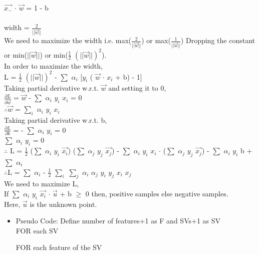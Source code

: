 \documentclass{article}
\begin{document}
\begin{itemize}
\begin{itemize}
        $\Vec{x_{-}}$ $\cdot$ $\Vec{w}$ = 1 - b
        \\ \\width  = $\frac{2}{||\Vec{w}||}$
        \\We need to maximize the width i.e. max($\frac{2}{||\Vec{w}||}$) or max($\frac{1}{||\Vec{w}||}$) Dropping the constant or min($||\Vec{w}||$) or min($\frac{1}{2}$ $(||\Vec{w}||)^{2}$).
        \\In order to maximize the width,
        \\L = $\frac{1}{2}$ $(||\Vec{w}||)^{2}$ - $\sum$ $\alpha_{i}$ [$y_{i}$ ( $\Vec{w}$ $\cdot$ $x_{i}$ + b) - 1]
        \\Taking partial derivative w.r.t. $\Vec{w}$ and setting it to 0,
        \\$\frac{\partial L}{\partial \Vec{w}}$ = $\Vec{w}$ - $\sum$ $\alpha_{i}$ $y_{i}$ $x_{i}$ = 0 
        \\$\therefore \Vec{w}$ = $\sum_{i}$ $\alpha_{i}$ $y_{i}$ $x_{i}$
        \\Taking partial derivative w.r.t. b,
        \\$\frac{\partial L}{\partial b}$ = - $\sum$ $\alpha_{i}$ $y_{i}$ = 0
        \\$\sum$ $\alpha_{i}$ $y_{i}$ = 0
        \\$\therefore$ L = $\frac{1}{2}$ ($\sum$ $\alpha_{i}$ $y_{i}$ $\Vec{x_{i}}$) ($\sum$ $\alpha_{j}$ $y_{j}$ $\Vec{x_{j}}$) - $\sum$ $\alpha_{i}$ $y_{i}$ $x_{i}$ $\cdot$ ($\sum$ $\alpha_{j}$ $y_{j}$ $\Vec{x_{j}}$) - $\sum$ $\alpha_{i}$ $y_{i}$ b + $\sum$ $\alpha_{i}$
        \\$\therefore $L = $\sum$ $\alpha_{i}$ - $\frac{1}{2}$ $\sum_{i}$ $\sum_{j}$ $\alpha_{i}$ $\alpha_{j}$ $y_{i}$ $y_{j}$ $x_{i}$ $x_{j}$
        \\We need to maximize L,
        \\If $\sum$ $\alpha_{i}$ $y_{i}$ $\Vec{x_{i}}$ $\cdot$ $\Vec{u}$ + b $\geq$ 0 then, positive samples else negative samples.
        \\Here, $\Vec{u}$ is the unknown point.
    \end{itemize}
    
    \begin{itemize}
        \item Pseudo Code: 
        Define number of features+1 as F and SVs+1 as SV
        \\FOR each SV
        
        	\quad FOR each feature of the SV
        

\end{itemize}
\end{itemize}
\end{document}
